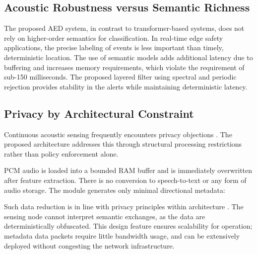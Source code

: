 \documentclass[conference]{IEEEtran}
\begin{document}
\subsection{Acoustic Robustness versus Semantic Richness}
The proposed AED system, in contrast to transformer-based systems, does not rely on higher-order semantics for classification. In real-time edge safety applications, the precise labeling of events is less important than timely, deterministic location. The use of semantic models adds additional latency due to buffering and increases memory requirements, which violate the requirement of sub-150 milliseconds. The proposed layered filter using spectral and periodic rejection provides stability in the alerts while maintaining deterministic latency.

\subsection{Privacy by Architectural Constraint}
Continuous acoustic sensing frequently encounters privacy objections \cite{b4, b33}. The proposed architecture addresses this through structural processing restrictions rather than policy enforcement alone.

PCM audio is loaded into a bounded RAM buffer and is immediately overwritten after feature extraction. There is no conversion to speech-to-text or any form of audio storage. The module generates only minimal directional metadata:
\begin{equation}
[\texttt{TIMESTAMP, ANOMALY\_CONFIDENCE, AZIMUTH\_ANGLE}]
\end{equation}

Such data reduction is in line with privacy principles within architecture \cite{b32}. The sensing node cannot interpret semantic exchanges, as the data are deterministically obfuscated. This design feature ensures scalability for operation; metadata data packets require little bandwidth usage, and can be extensively deployed without congesting the network infrastructure.
\end{document}
